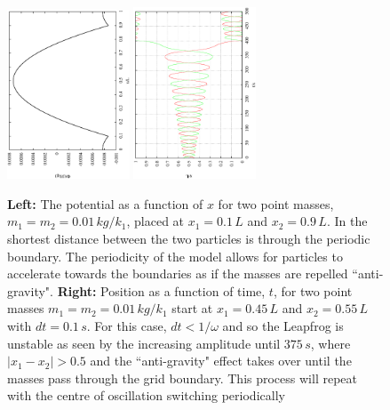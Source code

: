 \documentclass[10pt,a4paper]{article}
\begin{document}
\begin{figure}[h!]
\begin{center}
\includegraphics[width =0.325\textwidth, angle =-90]{edges.eps}
\includegraphics[width =0.325\textwidth, angle =-90]{Leap0.1.eps}
\caption{\textbf{Left: }The potential as a function of $x$ for two point masses, $m_1=m_2=0.01\, kg/k_1$, placed at $x_1=0.1\,L$ and $x_2 = 0.9\,L$. In the shortest distance between the two particles is through the periodic boundary. The periodicity of the model allows for particles to accelerate towards the boundaries as if the masses are repelled ``anti-gravity".  \textbf{Right: }Position as a function of time, $t$, for two point masses $m_1 = m_2 = 0.01\, kg/k_1$ start at $x_1 = 0.45 \,L$ and $x_2 = 0.55\,L$ with $dt=0.1\,s$. For this case, $dt < 1/\omega$ and so the Leapfrog is unstable as seen by the increasing amplitude until $375\, s$, where $|x_1-x_2| > 0.5$ and the ``anti-gravity" effect takes over until the masses pass through the grid boundary. This process will repeat with the centre of oscillation switching periodically}
\label{fig:boundaryEffect}
\end{center}
\end{figure}
\newpage
\newpage
\end{document}
